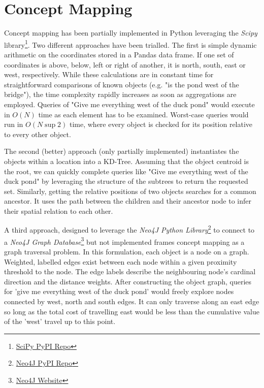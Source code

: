 \section{Concept Mapping}
\label{section:concept}

Concept mapping has been partially implemented in Python leveraging the \textit{Scipy} library\footnote{\href{https://pypi.org/project/scipy/}{SciPy PyPI Repo}}. Two different approaches have been trialled. 
The first is simple dynamic arithmetic on the coordinates stored in a Pandas data frame. If one set of coordinates is above, below, left or right of another, it is north, south, east or west, respectively. 
While these calculations are in constant time for straightforward comparisons of known objects (e.g. "is the pond west of the bridge"), the time complexity rapidly increases as soon as aggregations are employed. 
Queries of "Give me everything west of the duck pond" would execute in $O(N)$ time as each element has to be examined. Worst-case queries would run in $O(N\sup{2})$ time, where every object is checked for its position relative to every other object. 

The second (better) approach (only partially implemented) instantiates the objects within a location into a KD-Tree. 
Assuming that the object centroid is the root, we can quickly complete queries like "Give me everything west of the duck pond" by leveraging the structure of the subtrees to return the requested set. 
Similarly, getting the relative positions of two objects searches for a common ancestor. It uses the path between the children and their ancestor node to infer their spatial relation to each other.

A third approach, designed to leverage the \textit{Neo4J Python Library}\footnote{\href{https://pypi.org/project/neo4j/}{Neo4J PyPI Repo}} to connect to a \textit{Neo4J Graph Database}\footnote{\href{https://neo4j.com/}{Neo4J Website}} but not implemented frames concept mapping as a graph traversal problem. 
In this formulation, each object is a node on a graph. Weighted, labelled edges exist between each node within a given proximity threshold to the node. 
The edge labels describe the neighbouring node's cardinal direction and the distance weights. 
After constructing the object graph, queries for 'give me everything west of the duck pond' would freely explore nodes connected by west, north and south edges. 
It can only traverse along an east edge so long as the total cost of travelling east would be less than the cumulative value of the 'west' travel up to this point. 

